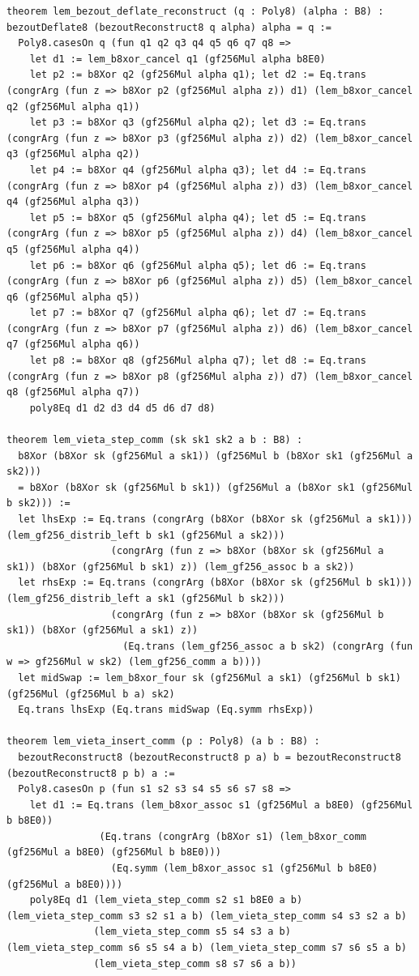 \documentclass[11pt,letterpaper]{article}
\theoremstyle{spectralthm}
\begin{document}
\begin{lstlisting}[language=Lean4,caption={Standalone Pure Init.Prelude Term-Mode Lean 4 Kernel Suite (thm30--thm61, v0.0.0, 0 sorry, 0 axioms).},label={lst:lean_unified}]
theorem lem_bezout_deflate_reconstruct (q : Poly8) (alpha : B8) : bezoutDeflate8 (bezoutReconstruct8 q alpha) alpha = q :=
  Poly8.casesOn q (fun q1 q2 q3 q4 q5 q6 q7 q8 =>
    let d1 := lem_b8xor_cancel q1 (gf256Mul alpha b8E0)
    let p2 := b8Xor q2 (gf256Mul alpha q1); let d2 := Eq.trans (congrArg (fun z => b8Xor p2 (gf256Mul alpha z)) d1) (lem_b8xor_cancel q2 (gf256Mul alpha q1))
    let p3 := b8Xor q3 (gf256Mul alpha q2); let d3 := Eq.trans (congrArg (fun z => b8Xor p3 (gf256Mul alpha z)) d2) (lem_b8xor_cancel q3 (gf256Mul alpha q2))
    let p4 := b8Xor q4 (gf256Mul alpha q3); let d4 := Eq.trans (congrArg (fun z => b8Xor p4 (gf256Mul alpha z)) d3) (lem_b8xor_cancel q4 (gf256Mul alpha q3))
    let p5 := b8Xor q5 (gf256Mul alpha q4); let d5 := Eq.trans (congrArg (fun z => b8Xor p5 (gf256Mul alpha z)) d4) (lem_b8xor_cancel q5 (gf256Mul alpha q4))
    let p6 := b8Xor q6 (gf256Mul alpha q5); let d6 := Eq.trans (congrArg (fun z => b8Xor p6 (gf256Mul alpha z)) d5) (lem_b8xor_cancel q6 (gf256Mul alpha q5))
    let p7 := b8Xor q7 (gf256Mul alpha q6); let d7 := Eq.trans (congrArg (fun z => b8Xor p7 (gf256Mul alpha z)) d6) (lem_b8xor_cancel q7 (gf256Mul alpha q6))
    let p8 := b8Xor q8 (gf256Mul alpha q7); let d8 := Eq.trans (congrArg (fun z => b8Xor p8 (gf256Mul alpha z)) d7) (lem_b8xor_cancel q8 (gf256Mul alpha q7))
    poly8Eq d1 d2 d3 d4 d5 d6 d7 d8)

theorem lem_vieta_step_comm (sk sk1 sk2 a b : B8) :
  b8Xor (b8Xor sk (gf256Mul a sk1)) (gf256Mul b (b8Xor sk1 (gf256Mul a sk2)))
  = b8Xor (b8Xor sk (gf256Mul b sk1)) (gf256Mul a (b8Xor sk1 (gf256Mul b sk2))) :=
  let lhsExp := Eq.trans (congrArg (b8Xor (b8Xor sk (gf256Mul a sk1))) (lem_gf256_distrib_left b sk1 (gf256Mul a sk2)))
                  (congrArg (fun z => b8Xor (b8Xor sk (gf256Mul a sk1)) (b8Xor (gf256Mul b sk1) z)) (lem_gf256_assoc b a sk2))
  let rhsExp := Eq.trans (congrArg (b8Xor (b8Xor sk (gf256Mul b sk1))) (lem_gf256_distrib_left a sk1 (gf256Mul b sk2)))
                  (congrArg (fun z => b8Xor (b8Xor sk (gf256Mul b sk1)) (b8Xor (gf256Mul a sk1) z))
                    (Eq.trans (lem_gf256_assoc a b sk2) (congrArg (fun w => gf256Mul w sk2) (lem_gf256_comm a b))))
  let midSwap := lem_b8xor_four sk (gf256Mul a sk1) (gf256Mul b sk1) (gf256Mul (gf256Mul b a) sk2)
  Eq.trans lhsExp (Eq.trans midSwap (Eq.symm rhsExp))

theorem lem_vieta_insert_comm (p : Poly8) (a b : B8) :
  bezoutReconstruct8 (bezoutReconstruct8 p a) b = bezoutReconstruct8 (bezoutReconstruct8 p b) a :=
  Poly8.casesOn p (fun s1 s2 s3 s4 s5 s6 s7 s8 =>
    let d1 := Eq.trans (lem_b8xor_assoc s1 (gf256Mul a b8E0) (gf256Mul b b8E0))
                (Eq.trans (congrArg (b8Xor s1) (lem_b8xor_comm (gf256Mul a b8E0) (gf256Mul b b8E0)))
                  (Eq.symm (lem_b8xor_assoc s1 (gf256Mul b b8E0) (gf256Mul a b8E0))))
    poly8Eq d1 (lem_vieta_step_comm s2 s1 b8E0 a b) (lem_vieta_step_comm s3 s2 s1 a b) (lem_vieta_step_comm s4 s3 s2 a b)
               (lem_vieta_step_comm s5 s4 s3 a b)   (lem_vieta_step_comm s6 s5 s4 a b) (lem_vieta_step_comm s7 s6 s5 a b)
               (lem_vieta_step_comm s8 s7 s6 a b))


\end{lstlisting}
\end{document}
